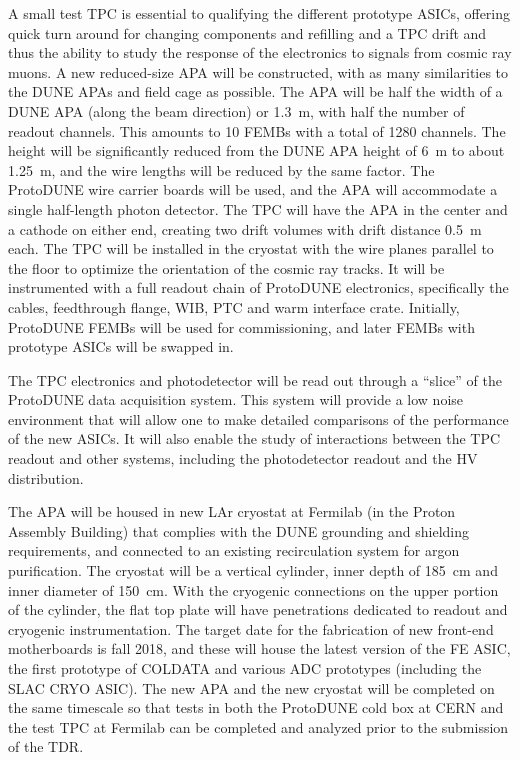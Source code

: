 A small test TPC is essential to qualifying the different prototype ASICs, offering quick turn around for changing components and refilling and a TPC drift and thus the ability to study the response of the electronics to signals from cosmic ray muons.  
A new reduced-size APA will be constructed, with as many similarities to the DUNE APAs and field cage as possible.  The APA will be half the width of a DUNE APA (along the beam direction) or 1.3~m, with half the number of readout channels.  This amounts to 10 FEMBs with a total of 1280 channels.
The height will be significantly reduced from the DUNE APA height of 6~m to about 1.25~m, and the wire lengths will be reduced by the same factor.  The ProtoDUNE wire carrier boards will be used, and 
 the APA will accommodate a single half-length photon detector.  The TPC will have the APA in the center and a cathode on either end, creating two drift volumes with drift distance 0.5~m each.  The TPC will be installed in the cryostat with the wire planes parallel to the floor to optimize the orientation of the cosmic ray tracks.
 It will be instrumented with a full readout chain of ProtoDUNE electronics, specifically  the cables, feedthrough flange, WIB, PTC and warm interface crate.  Initially, ProtoDUNE FEMBs will be used for commissioning, and later FEMBs with prototype ASICs will be swapped in.

The TPC electronics and photodetector will be read out through a ``slice'' of the ProtoDUNE data acquisition system.  This system will provide a low noise environment that will allow one to make detailed comparisons of the performance of the new ASICs. It will also enable the study of interactions between the TPC readout and other systems, including the photodetector readout and the HV distribution.
 
The APA will be housed in new LAr cryostat at Fermilab (in the Proton Assembly Building) that complies with the DUNE grounding and shielding requirements, and connected to an existing recirculation system for argon purification.  The cryostat will be a vertical cylinder, inner depth of 185~cm and inner diameter of 150~cm.  With the cryogenic connections on the upper portion of the cylinder, the flat top plate will have penetrations dedicated to readout and cryogenic instrumentation.  The target date for the fabrication of new front-end motherboards is fall 2018, and these will house the latest version of the FE ASIC, the first prototype of COLDATA and various ADC prototypes (including the SLAC CRYO ASIC).   The new APA and the new cryostat will be completed on the same timescale so that tests in both the ProtoDUNE cold box at CERN and the test TPC at Fermilab can be completed and analyzed prior to the submission of the TDR.  
